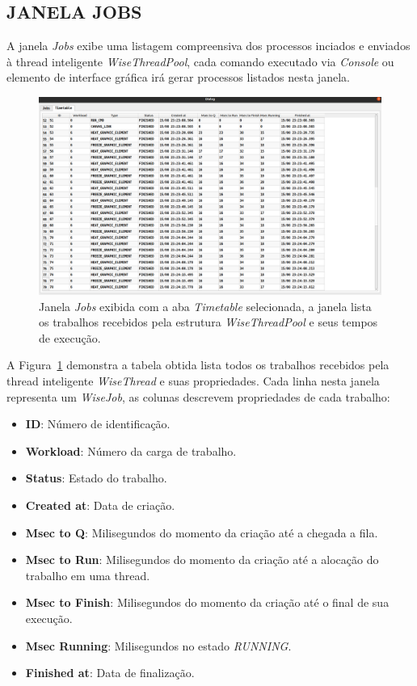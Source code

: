\documentclass[a4paper,12pt]{monografia}
\theoremstyle{plain}
\theoremstyle{definition}
\theoremstyle{remark}
\begin{document}
\subsection{JANELA JOBS}\label{sec:janela_jobs}

A janela \textit{Jobs} exibe uma listagem compreensiva dos processos inciados e enviados à thread inteligente \textit{WiseThreadPool}, cada comando executado via \textit{Console} ou elemento de interface gráfica irá gerar processos listados nesta janela.

\begin{figure}[!htbp]
	\centering
	\includegraphics[width=\linewidth]{Figures/IGU_023.png}
	\caption{Janela \textit{Jobs} exibida com a aba \textit{Timetable} selecionada, a janela lista os trabalhos recebidos pela estrutura \textit{WiseThreadPool} e seus tempos de execução.}
	\label{fig:jobs}
\end{figure}

A Figura~\ref{fig:jobs} demonstra a tabela obtida lista todos os trabalhos recebidos pela thread inteligente \textit{WiseThread} e suas propriedades. Cada linha nesta janela representa um \textit{WiseJob}, as colunas descrevem propriedades de cada trabalho:

\begin{itemize}
	\item \textbf{ID}: Número de identificação.
	\item \textbf{Workload}: Número da carga de trabalho.
	\item \textbf{Status}: Estado do trabalho.
	\item \textbf{Created at}: Data de criação.
	\item \textbf{Msec to Q}: Milisegundos do momento da criação até a chegada a fila.
	\item \textbf{Msec to Run}: Milisegundos do momento da criação até a alocação do trabalho em uma thread.
	\item \textbf{Msec to Finish}: Milisegundos do momento da criação até o final de sua execução.
	\item \textbf{Msec Running}: Milisegundos no estado \textit{RUNNING}.
	\item \textbf{Finished at}: Data de finalização.
\end{itemize}
\end{document}
